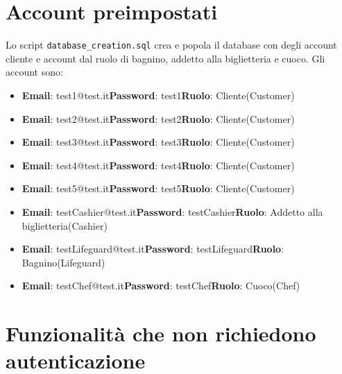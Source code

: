 \documentclass{article}
\begin{document}
\section{Account preimpostati}
Lo script \texttt{database\_creation.sql} crea e popola il database con degli account cliente e account dal ruolo di bagnino, addetto alla biglietteria e cuoco.
Gli account sono:
\begin{itemize}
	\item \textbf{Email}: test1@test.it\newline\textbf{Password}: test1\newline\textbf{Ruolo}: Cliente(Customer)
	\item \textbf{Email}: test2@test.it\newline\textbf{Password}: test2\newline\textbf{Ruolo}: Cliente(Customer)
	\item \textbf{Email}: test3@test.it\newline\textbf{Password}: test3\newline\textbf{Ruolo}: Cliente(Customer)
	\item \textbf{Email}: test4@test.it\newline\textbf{Password}: test4\newline\textbf{Ruolo}: Cliente(Customer)
	\item \textbf{Email}: test5@test.it\newline\textbf{Password}: test5\newline\textbf{Ruolo}: Cliente(Customer)
	\item \textbf{Email}: testCashier@test.it\newline\textbf{Password}: testCashier\newline\textbf{Ruolo}: Addetto alla biglietteria(Cashier)
	\item \textbf{Email}: testLifeguard@test.it\newline\textbf{Password}: testLifeguard\newline\textbf{Ruolo}: Bagnino(Lifeguard)
	\item \textbf{Email}: testChef@test.it\newline\textbf{Password}: testChef\newline\textbf{Ruolo}: Cuoco(Chef)
\end{itemize}
\newpage
\section{Funzionalità che non richiedono autenticazione}
\end{document}
